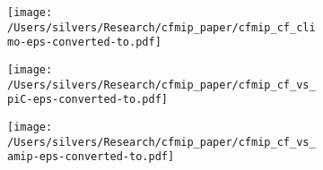 \documentclass[varwidth, border=10pt]{standalone}
\begin{document}
\begin{figure}
  \centering
  \begin{subfigure}{0.31\textwidth}
    \texttt{[image: /Users/silvers/Research/cfmip\_paper/cfmip\_cf\_climo-eps-converted-to.pdf]}
\end{subfigure}
\begin{subfigure}{0.31\textwidth}
  \texttt{[image: /Users/silvers/Research/cfmip\_paper/cfmip\_cf\_vs\_piC-eps-converted-to.pdf]}
\end{subfigure}
\begin{subfigure}{0.31\textwidth}
  \texttt{[image: /Users/silvers/Research/cfmip\_paper/cfmip\_cf\_vs\_amip-eps-converted-to.pdf]}
\end{subfigure}
\end{figure}
\end{document}
